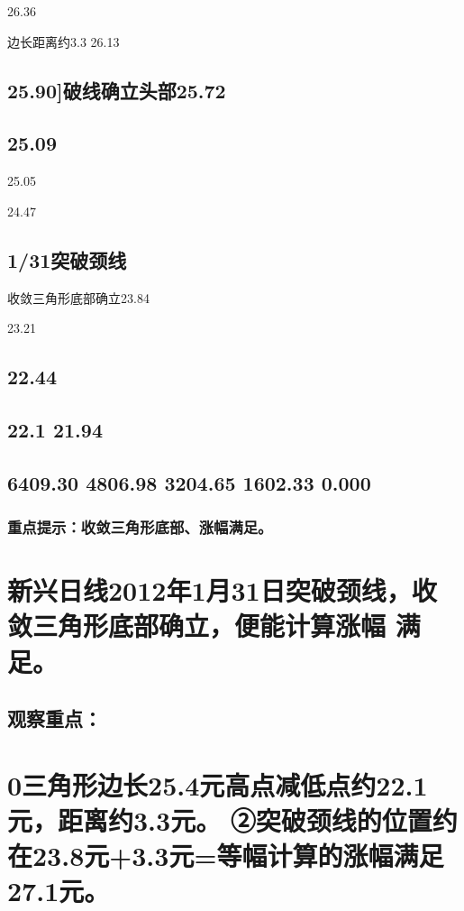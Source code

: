 \documentclass{article}
\begin{document}
26.36

边长距离约3.3 26.13

\subsection{25.90]破线确立头部25.72}

\subsection{25.09}

25.05

24.47

\subsection{1/31突破颈线}

收敛三角形底部确立23.84

23.21

\subsection{22.44}

\subsection{22.1 21.94}

\subsection{6409.30 4806.98 3204.65 1602.33 0.000}

\subsubsection{重点提示：收敛三角形底部、涨幅满足。}

\section{新兴日线2012年1月31日突破颈线，收敛三角形底部确立，便能计算涨幅 满足。}

\subsection{观察重点：}

\section{0三角形边长25.4元高点减低点约22.1元，距离约3.3元。 ②突破颈线的位置约在23.8元+3.3元=等幅计算的涨幅满足27.1元。}
\end{document}
